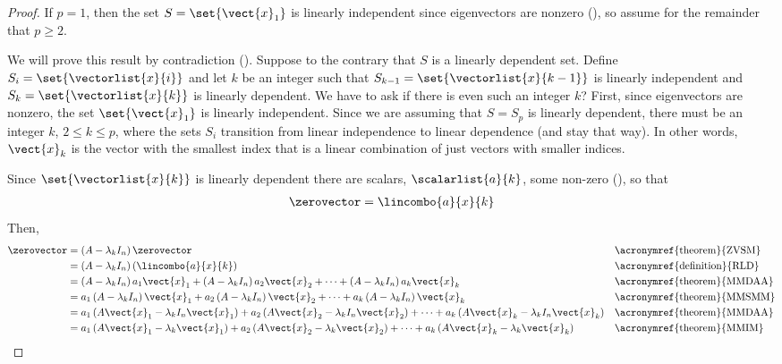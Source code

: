 \begin{proof}
If $p=1$, then the set $S=\set{\vect{x}_1}$ is linearly independent since eigenvectors are nonzero (), so assume for the remainder that $p\geq 2$.\par
%
We will prove this result by contradiction ().  Suppose to the contrary that $S$ is a linearly dependent set.  Define $S_i=\set{\vectorlist{x}{i}}$ and let 
$k$ be an integer such that $S_{k-1}=\set{\vectorlist{x}{k-1}}$ is linearly independent and $S_k=\set{\vectorlist{x}{k}}$ is linearly dependent.  We have to ask if there is even such an integer $k$?  First, since eigenvectors are nonzero, the set $\set{\vect{x}_1}$ is linearly independent.  Since we are assuming that $S=S_p$ is linearly dependent, there must be an integer $k$, $2\leq k\leq p$, where the sets $S_i$ transition from linear independence to linear dependence (and stay that way). In other words, $\vect{x}_k$ is the vector with the smallest index that is a linear combination of just vectors with smaller indices.\par
%
Since $\set{\vectorlist{x}{k}}$ is linearly dependent there are scalars, $\scalarlist{a}{k}$, some non-zero (), so that 
%
\begin{align*}
\zerovector=\lincombo{a}{x}{k}
\end{align*}
%
Then,
%
\begin{align*}
\zerovector
&=\left(A-\lambda_kI_n\right)\zerovector
&&\text{\acronymref{theorem}{ZVSM}}\\
%
&=\left(A-\lambda_kI_n\right)\left(\lincombo{a}{x}{k}\right)
&&\text{\acronymref{definition}{RLD}}\\
%
&=\left(A-\lambda_kI_n\right)a_1\vect{x}_1+
\left(A-\lambda_kI_n\right)a_2\vect{x}_2+
\cdots+
\left(A-\lambda_kI_n\right)a_k\vect{x}_k
&&\text{\acronymref{theorem}{MMDAA}}\\
%
&=a_1\left(A-\lambda_kI_n\right)\vect{x}_1+
a_2\left(A-\lambda_kI_n\right)\vect{x}_2+
\cdots+
a_k\left(A-\lambda_kI_n\right)\vect{x}_k
&&\text{\acronymref{theorem}{MMSMM}}\\
%
&=a_1\left(A\vect{x}_1-\lambda_kI_n\vect{x}_1\right)+
a_2\left(A\vect{x}_2-\lambda_kI_n\vect{x}_2\right)+
\cdots+
a_k\left(A\vect{x}_k-\lambda_kI_n\vect{x}_k\right)
&&\text{\acronymref{theorem}{MMDAA}}\\
%
&=a_1\left(A\vect{x}_1-\lambda_k\vect{x}_1\right)+
a_2\left(A\vect{x}_2-\lambda_k\vect{x}_2\right)+
\cdots+
a_k\left(A\vect{x}_k-\lambda_k\vect{x}_k\right)
&&\text{\acronymref{theorem}{MMIM}}\\

\end{align*}
\end{proof}
